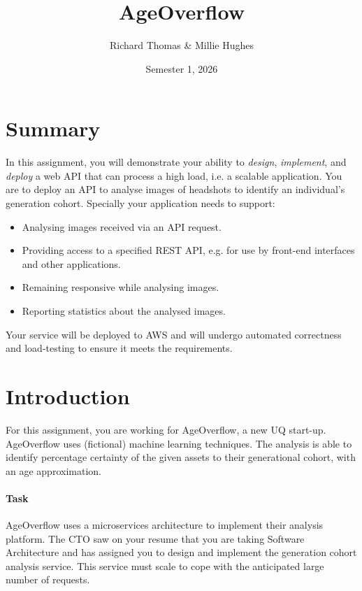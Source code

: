 \documentclass{csse4400}
\title{AgeOverflow}
\author{Richard Thomas \& Millie Hughes}
\date{Semester 1, 2026}
\begin{document}

\maketitle


\section*{Summary}
In this assignment, you will demonstrate your ability to \textit{design},
\textit{implement}, and \textit{deploy} a web API that can process a high load,
i.e. a scalable application.
You are to deploy an API to analyse images of headshots to identify an individual's generation cohort.
Specially your application needs to support:
\begin{itemize}
    \item Analysing images received via an API request.
    \item Providing access to a specified REST API, e.g. for use by front-end interfaces and other applications.
    \item Remaining responsive while analysing images.
    \item Reporting statistics about the analysed images.
\end{itemize}

\noindent
Your service will be deployed to AWS and will undergo automated correctness and load-testing to ensure it meets the requirements.



\section{Introduction}
For this assignment, you are working for AgeOverflow, a new UQ start-up.
AgeOverflow uses (fictional) machine learning techniques.
The analysis is able to identify percentage certainty of the given assets to their generational cohort,
with an age approximation.

\paragraph{Task}
AgeOverflow uses a microservices architecture to implement their analysis platform.
The CTO saw on your resume that you are taking Software Architecture
and has assigned you to design and implement the generation cohort analysis service.
This service must scale to cope with the anticipated large number of requests.
\end{document}
